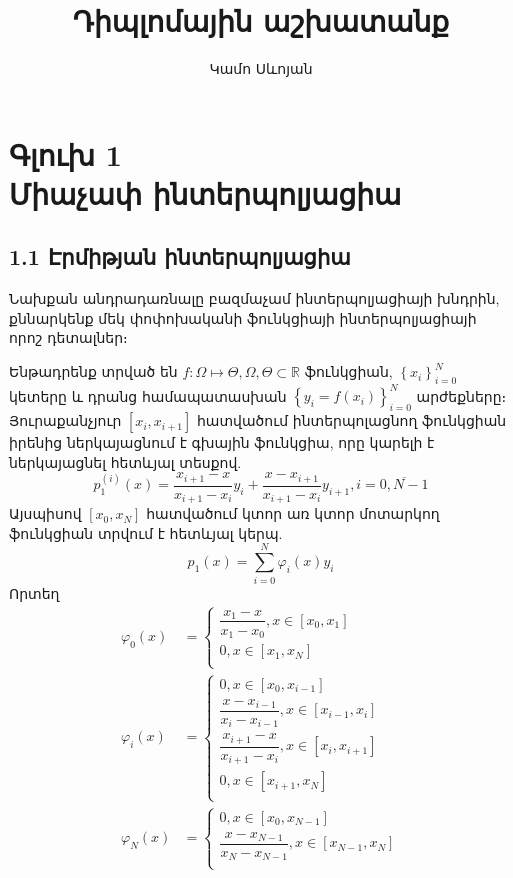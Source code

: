 \documentclass[fleqn, bachelor,subf,12pt,notitlepage]{article}
\title{Դիպլոմային աշխատանք}
\author{Կամո Սևոյան}
\begin{document}
\sloppy


\section*{\centering Գլուխ 1\\ Միաչափ ինտերպոլյացիա}
\subsection*{1.1 Էրմիթյան ինտերպոլյացիա}
\hspace{\parindent}Նախքան անդրադառնալը բազմաչամ ինտերպոլյացիայի խնդրին, քննարկենք մեկ փոփոխականի ֆունկցիայի ինտերպոլյացիայի որոշ դետալներ։

Ենթադրենք տրված են $f:\Omega \mapsto \Theta, \Omega, \Theta \subset \mathbb{R}$ ֆունկցիան,  $\left\{x_{i}\right\}_{i=0}^{N}$ կետերը և դրանց համապատասխան $\left\{y_{i}=f\left(x_{i}\right)\right\}_{i=0}^{N}$ արժեքները։ Յուրաքանչյուր $\left[x_{i}, x_{i+1}\right]$ հատվածում  ինտերպոլացնող ֆունկցիան իրենից ներկայացնում է գխային ֆունկցիա, որը կարելի է ներկայացնել հետևյալ տեսքով.
\begin{equation}
p_{1}^{(i)}\left(x\right)=\dfrac{x_{i+1}-x}{x_{i+1}-x_{i}}y_{i}+\dfrac{x-x_{i+1}}{x_{i+1}-x_{i}}y_{i+1}, i=\overline{0, N-1}
\end{equation}
Այսպիսով $\left[x_{0}, x_{N}\right]$ հատվածում կտոր առ կտոր մոտարկող ֆունկցիան տրվում է հետևյալ կերպ.
\begin{equation}
p_{1}\left(x\right)=\sum_{i=0}^{N}\varphi_{i} \left(x\right)y_{i}
\end{equation}
Որտեղ 
\begin{equation}
\begin{aligned}
\varphi_{0}\left(x\right)&=\begin{cases}
\dfrac{x_{1}-x}{x_{1}-x_{0}}, x\in \left[x_{0}, x_{1}\right]\\
0, x\in \left[x_{1}, x_{N}\right]\\
\end{cases}\\
\varphi_{i}\left(x\right)&=\begin{cases}
0, x\in \left[x_{0}, x_{i-1}\right]\\
\dfrac{x-x_{i-1}}{x_{i}-x_{i-1}}, x\in \left[x_{i-1}, x_{i}\right]\\
\dfrac{x_{i+1}-x}{x_{i+1}-x_{i}}, x\in \left[x_{i}, x_{i+1}\right]\\
0, x\in \left[x_{i+1}, x_{N}\right]\\
\end{cases}\\
\varphi_{N}\left(x\right)&=\begin{cases}
0, x\in \left[x_{0}, x_{N-1}\right]\\
\dfrac{x-x_{N-1}}{x_{N}-x_{N-1}}, x\in \left[x_{N-1}, x_{N}\right]\\
\end{cases}
\end{aligned}
\end{equation}
\end{document}
